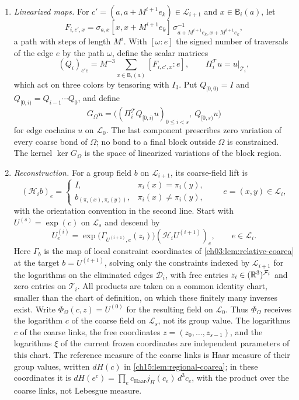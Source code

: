\begin{definition}
\begin{enumerate}
\item \emph{Linearized maps.} For $c'=(a,a+M^{i+1}e_k)\in\mathcal L_{i+1}$ and $x\in\mathsf B_i(a)$, let
\[
 F_{i,c',x}=\sigma_{a,x}[x,x+M^{i+1}e_k]\,
               \sigma_{a+M^{i+1}e_k,x+M^{i+1}e_k}^{-1},
\]
a path with steps of length $M^i$. With $[\omega:e]$ the signed number of traversals of the edge $e$ by the path $\omega$, define the scalar matrices
\[
 (Q_i)_{c'e}=M^{-3}\sum_{x\in\mathsf B_i(a)}[F_{i,c',x}:e],
 \qquad \Pi^{\mathcal T}_i u=u|_{\mathcal T_i},
\]
which act on three colors by tensoring with $I_3$. Put $Q_{[0,0)}=I$ and $Q_{[0,i)}=Q_{i-1}\cdots Q_0$, and define
\begin{equation}\label{ch15:eq:constraint-map}
 G_\Omega u=
 \bigl((\Pi^{\mathcal T}_iQ_{[0,i)}u)_{0\le i<s},\ Q_{[0,s)}u\bigr)
\end{equation}
for edge cochains $u$ on $\mathcal L_0$. The last component prescribes zero variation of every coarse bond of $\Omega$; no bond to a final block outside $\Omega$ is constrained. The kernel $\ker G_\Omega$ is the space of linearized variations of the block region.
\item \emph{Reconstruction.} For a group field $b$ on $\mathcal L_{i+1}$, its coarse-field lift is
\begin{equation}\label{ch15:eq:internal-lift}
 (\mathcal H_i b)_e=
 \begin{cases}
 I,&\pi_i(x)=\pi_i(y),\\
 b_{(\pi_i(x),\pi_i(y))},&\pi_i(x)\ne\pi_i(y),
 \end{cases}
 \qquad e=(x,y)\in\mathcal L_i,
\end{equation}
with the orientation convention in the second line. Start with $U^{(s)}=\exp(c)$ on $\mathcal L_s$ and descend by
\begin{equation}\label{ch15:eq:internal-reconstruction}
 U^{(i)}_e=
 \exp\bigl(\Gamma_{U^{(i+1)},e}(z_i)\bigr)
                       (\mathcal H_iU^{(i+1)})_e,
 \qquad e\in\mathcal L_i .
\end{equation}
Here $\Gamma_b$ is the map of local constraint coordinates of \cref{ch03:lem:relative-coarea} at the target $b=U^{(i+1)}$, solving only the constraints indexed by $\mathcal L_{i+1}$ for the logarithms on the eliminated edges $\mathcal D_i$, with free entries $z_i\in(\mathbb R^3)^{\mathcal F_i}$ and zero entries on $\mathcal T_i$. All products are taken on a common identity chart, smaller than the chart of definition, on which these finitely many inverses exist. Write $\Phi_\Omega(c,z)=U^{(0)}$ for the resulting field on $\mathcal L_0$. Thus $\Phi_\Omega$ receives the logarithm $c$ of the coarse field on $\mathcal L_s$, not its group value. The logarithms $c$ of the coarse links, the free coordinates $z=(z_0,\ldots,z_{s-1})$, and the logarithms $\xi$ of the current frozen coordinates are independent parameters of this chart. The reference measure of the coarse links is Haar measure of their group values, written $dH(c)$ in \cref{ch15:lem:regional-coarea}; in these coordinates it is $dH(e^c)=\prod_ec_{\mathrm{Haar}}j_H(c_e)\,d^3c_e$, with the product over the coarse links, not Lebesgue measure.

\end{enumerate}
\end{definition}
